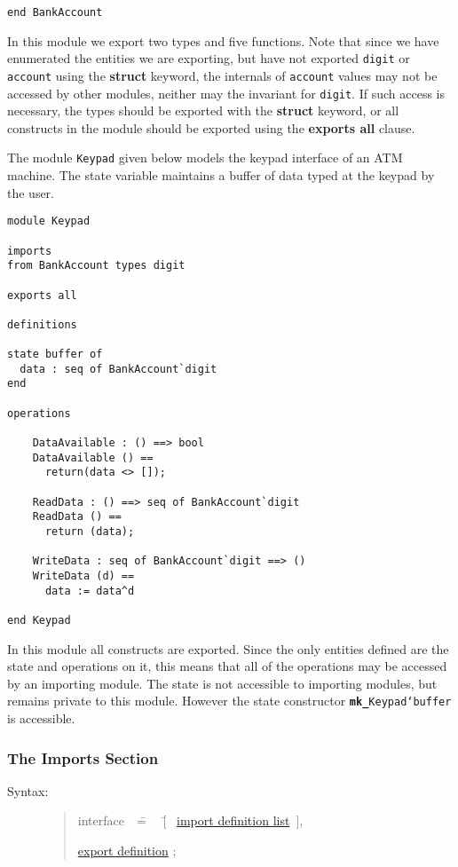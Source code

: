\documentclass{overturerepchap}
\newcommand{\Rule}[2]{
  \begin{quote}\begin{tabbing}
    #1\index{#1}\ \ \= = \ \ \= #2  ; %

  \end{tabbing}\end{quote}
  }
\newcommand{\Ruleref}[1]{
  \hyperlink{rule:#1}{#1}}
\newcommand{\lfeed}{\\ \> \>}
\newcommand{\keyw}[1]{{\bf\ttfamily #1}}
\newcommand{\OptPt}[1]{[\ #1\ ]}
\begin{document}
{\begin{description}
\begin{lstlisting}
end BankAccount
\end{lstlisting}
In this module we export two types and five functions. Note that since
we have enumerated the entities we are exporting, but have not
exported \texttt{digit} or \texttt{account} using the \keyw{struct}
keyword, the internals of \texttt{account} values may not be accessed
by other modules, neither may the invariant for \texttt{digit}. If
such access is necessary, the types should be exported with the
\keyw{struct} keyword, or all constructs in the module should be
exported using the \keyw{exports all} clause.

The module \texttt{Keypad} given below models the keypad interface of
an ATM machine. The state variable maintains a buffer of data typed at
the keypad by the user.

\begin{lstlisting}
module Keypad

imports
from BankAccount types digit

exports all

definitions

state buffer of
  data : seq of BankAccount`digit
end

operations

    DataAvailable : () ==> bool
    DataAvailable () ==
      return(data <> []);

    ReadData : () ==> seq of BankAccount`digit
    ReadData () ==
      return (data);

    WriteData : seq of BankAccount`digit ==> ()
    WriteData (d) ==
      data := data^d

end Keypad
\end{lstlisting}
In this module all constructs are exported. Since the only entities
defined are the state and operations on it, this means that all of the
operations may be accessed by an importing module. The state is not
accessible to importing modules, but remains private to this
module. However the state constructor
\texttt{\keyw{mk\_}Keypad`buffer} is accessible.


\end{description}

\subsubsection{The Imports Section}

\begin{description}
\item[Syntax:]
  \Rule{interface}{
    \OptPt{\Ruleref{import definition list}}, \lfeed
    \Ruleref{export definition}
    }


\end{description}}
\end{document}
